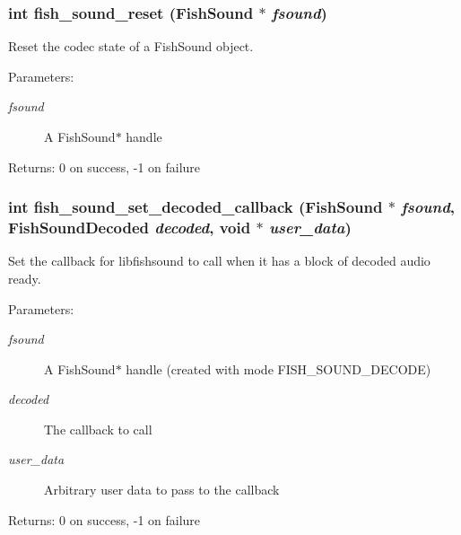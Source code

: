 \subsubsection{\setlength{\rightskip}{0pt plus 5cm}int fish\_\-sound\_\-reset ({\bf Fish\-Sound} $\ast$ {\em fsound})}\label{fishsound_8h_a10}


Reset the codec state of a Fish\-Sound object. 

\begin{Desc}
\item[Parameters:]
\begin{description}
\item[{\em fsound}]A Fish\-Sound$\ast$ handle \end{description}
\end{Desc}
\begin{Desc}
\item[Returns:]0 on success, -1 on failure \end{Desc}
\subsubsection{\setlength{\rightskip}{0pt plus 5cm}int fish\_\-sound\_\-set\_\-decoded\_\-callback ({\bf Fish\-Sound} $\ast$ {\em fsound}, {\bf Fish\-Sound\-Decoded} {\em decoded}, void $\ast$ {\em user\_\-data})}\label{fishsound_8h_a5}


Set the callback for libfishsound to call when it has a block of decoded audio ready. 

\begin{Desc}
\item[Parameters:]
\begin{description}
\item[{\em fsound}]A Fish\-Sound$\ast$ handle (created with mode FISH\_\-SOUND\_\-DECODE) \item[{\em decoded}]The callback to call \item[{\em user\_\-data}]Arbitrary user data to pass to the callback \end{description}
\end{Desc}
\begin{Desc}
\item[Returns:]0 on success, -1 on failure \end{Desc}

